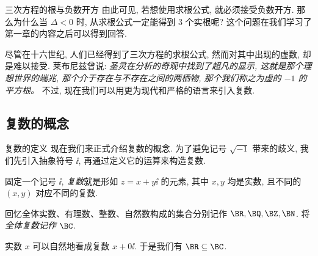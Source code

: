 \begin{frame}{三次方程的根与负数开方\noexer}
	\onslide<+->
	由此可见, 若想使用求根公式, 就\alert{必须接受负数开方}.
	\onslide<+->
	那么为什么当 $\Delta<0$ 时, 从求根公式一定能得到 $3$ 个实根呢?
	\onslide<+->
	这个问题在我们学习了第一章的内容之后可以得到回答.

	\onslide<+->
	尽管在十六世纪, 人们已经得到了三次方程的求根公式, 然而对其中出现的虚数, 却是难以接受.
	\onslide<+->
	莱布尼兹曾说: {\color{third}\itshape 圣灵在分析的奇观中找到了超凡的显示, 这就是那个理想世界的端兆, 那个介于存在与不存在之间的两栖物, 那个我们称之为虚的 $-1$ 的平方根。}
	\onslide<+->
	不过, 现在我们可以用更为现代和严格的语言来引入复数.
\end{frame}


\subsection{复数的概念}

\begin{frame}{复数的定义}
	\onslide<+->
	现在我们来正式介绍复数的概念.
	\onslide<+->
	为了避免记号 $\sqrt{-1}$ 带来的歧义, 我们先引入抽象符号 $\ii$, 再通过定义它的运算来构造复数.
	\onslide<+->
	\begin{definition}
		固定一个记号 $\ii$, \emph{复数}就是形如 $z=x+y\ii$ 的元素, 其中 $x,y$ 均是实数, 且不同的 $(x,y)$ 对应不同的复数.
	\end{definition}
	\onslide<+->
	回忆全体实数、有理数、整数、自然数构成的集合分别记作 $\BR,\BQ,\BZ,\BN$.
	\onslide<+->
	将\emph{全体复数记作 $\BC$}.

	\onslide<+->
	实数 $x$ 可以自然地看成复数 $x+0\ii$.
	\onslide<+->
	于是我们有 $\BR\subseteq \BC$.
\end{frame}


